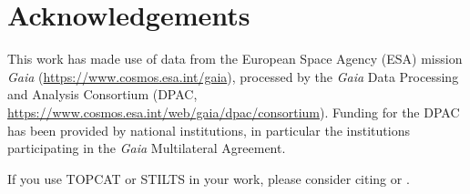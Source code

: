 \documentclass{article}
\newcommand{\paragap}{\vspace{1.5ex}}
\begin{document}
\section*{Acknowledgements}

This work has made use of data from the European Space Agency (ESA) mission
{\it Gaia} (\url{https://www.cosmos.esa.int/gaia}), processed by the {\it Gaia}
Data Processing and Analysis Consortium
(DPAC, \url{https://www.cosmos.esa.int/web/gaia/dpac/consortium}).
Funding for the DPAC
has been provided by national institutions, in particular the institutions
participating in the {\it Gaia} Multilateral Agreement.
\paragap

If you use TOPCAT or STILTS in your work, please consider citing
\cite{2005ASPC..347...29T} or \cite{2006ASPC..351..666T}.


\label{lastPage}
\end{document}
